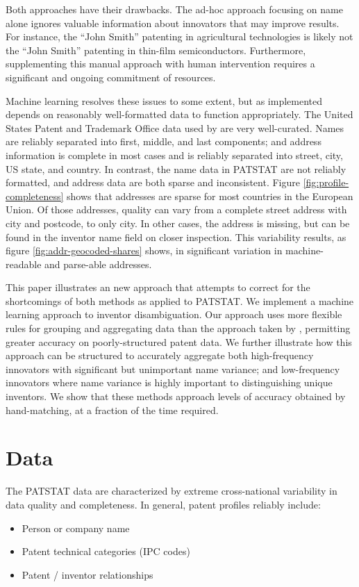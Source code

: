 \documentclass[11pt]{article}
\begin{document}
Both approaches have their drawbacks. The ad-hoc approach focusing on
name alone ignores valuable information about innovators that may
improve results. For instance, the ``John Smith'' patenting in
agricultural technologies is likely not the ``John Smith'' patenting
in thin-film semiconductors. Furthermore, supplementing this manual
approach with human intervention requires a significant and ongoing
commitment of resources. 

Machine learning resolves these issues to
some extent, but as implemented depends on reasonably well-formatted
data to function
appropriately. The United States Patent and Trademark Office data used by
\citeauthor{lai2011disambiguation} are very well-curated. Names
are reliably separated into first, middle, and last components;
and address information is complete in most cases and is reliably
separated into street, city, US state, and country. In contrast, the
name data in PATSTAT are not reliably formatted, and address data are
both sparse and inconsistent. Figure \ref{fig:profile-completeness}
shows that addresses are sparse for most countries in the European Union. Of those
addresses, quality can vary from a complete street address with city
and postcode, to only city. In other cases, the address is missing,
but can be found in the inventor name field on closer inspection. This
variability results, as figure \ref{fig:addr-geocoded-shares} shows,
in significant variation in machine-readable and parse-able addresses.

This paper illustrates an new approach that attempts to correct for
the shortcomings of both methods as applied to PATSTAT. We implement a
machine learning approach to inventor disambiguation. Our approach
uses more flexible rules for grouping and aggregating data than the
approach taken by \cite{lai2011disambiguation}, permitting greater
accuracy on poorly-structured patent data. We further illustrate how
this approach can be structured to accurately aggregate both
high-frequency innovators with significant but unimportant name
variance; and low-frequency innovators where name variance is highly
important to distinguishing unique inventors. We show that these
methods approach levels of accuracy obtained by hand-matching, at a
fraction of the time required.

\section{Data}
\label{sec:data}

The PATSTAT data are characterized by extreme cross-national
variability in data quality and completeness. In general, patent
profiles reliably include:
\begin{itemize}
\item Person or company name
\item Patent technical categories (IPC codes)
\item Patent / inventor relationships
\end{itemize}
\end{document}
